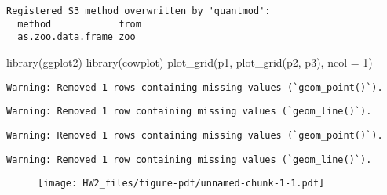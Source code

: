 \documentclass[
  letterpaper,
  DIV=11,
  numbers=noendperiod]{scrartcl}
\newenvironment{Shaded}{\begin{snugshade}}{\end{snugshade}}
\newcommand{\AttributeTok}[1]{\textcolor[rgb]{0.40,0.45,0.13}{#1}}
\newcommand{\DecValTok}[1]{\textcolor[rgb]{0.68,0.00,0.00}{#1}}
\newcommand{\FloatTok}[1]{\textcolor[rgb]{0.68,0.00,0.00}{#1}}
\newcommand{\FunctionTok}[1]{\textcolor[rgb]{0.28,0.35,0.67}{#1}}
\newcommand{\NormalTok}[1]{\textcolor[rgb]{0.00,0.23,0.31}{#1}}
\newcommand{\OtherTok}[1]{\textcolor[rgb]{0.00,0.23,0.31}{#1}}
\newcommand{\SpecialCharTok}[1]{\textcolor[rgb]{0.37,0.37,0.37}{#1}}
\newcommand{\StringTok}[1]{\textcolor[rgb]{0.13,0.47,0.30}{#1}}
\begin{document}
\begin{Shaded}
\end{Shaded}

\begin{verbatim}
Registered S3 method overwritten by 'quantmod':
  method            from
  as.zoo.data.frame zoo 
\end{verbatim}

\begin{Shaded}
\begin{Highlighting}[]
\FunctionTok{library}\NormalTok{(ggplot2)}
\FunctionTok{library}\NormalTok{(cowplot)}
\FunctionTok{plot\_grid}\NormalTok{(p1, }\FunctionTok{plot\_grid}\NormalTok{(p2, p3), }\AttributeTok{ncol =} \DecValTok{1}\NormalTok{)}
\end{Highlighting}
\end{Shaded}

\begin{verbatim}
Warning: Removed 1 rows containing missing values (`geom_point()`).
\end{verbatim}

\begin{verbatim}
Warning: Removed 1 row containing missing values (`geom_line()`).
\end{verbatim}

\begin{verbatim}
Warning: Removed 1 rows containing missing values (`geom_point()`).
\end{verbatim}

\begin{verbatim}
Warning: Removed 1 row containing missing values (`geom_line()`).
\end{verbatim}

\begin{figure}[H]

{\centering \texttt{[image: HW2\_files/figure-pdf/unnamed-chunk-1-1.pdf]}

}

\end{figure}
\end{document}

